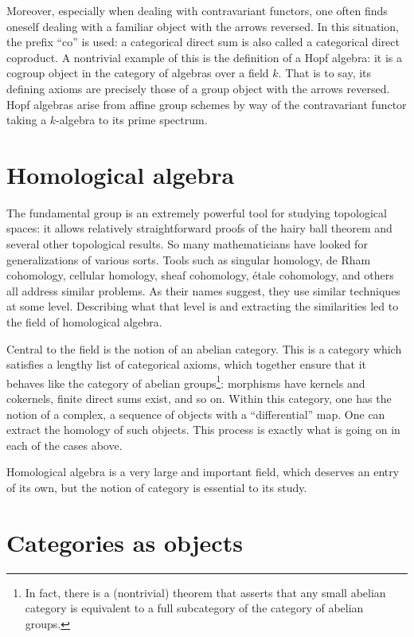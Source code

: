 \documentclass[12pt]{article}
\begin{document}
Moreover, especially when dealing with contravariant functors, one often finds oneself dealing with a familiar object with the arrows reversed.  In this situation, the prefix ``co'' is used: a categorical direct sum is also called a categorical direct coproduct.  A nontrivial example of this is the definition of a Hopf algebra: it is a cogroup object in the category of algebras over a field $k$. That is to say, its defining axioms are precisely those of a group object with the arrows reversed. Hopf algebras arise from affine group schemes by way of the contravariant functor taking a $k$-algebra to its prime spectrum.

\section*{Homological algebra}

The fundamental group is an extremely powerful tool for studying topological spaces: it allows relatively straightforward proofs of the hairy ball theorem and several other topological results.  So many mathematicians have looked for generalizations of various sorts.  Tools such as singular homology, de Rham cohomology, cellular homology, sheaf cohomology, \'etale cohomology, and others all address similar problems.  As their names suggest, they use similar techniques at some level.  Describing what that level is and extracting the similarities led to the field of homological algebra.

Central to the field is the notion of an abelian category.  This is a category which satisfies a lengthy list of categorical axioms, which together ensure that it behaves like the category of abelian groups\footnote{In fact, there is a (nontrivial) theorem that asserts that any small abelian category is equivalent to a full subcategory of the category of abelian groups.}: morphisms have kernels and cokernels, finite direct sums exist, and so on.  Within this category, one has the notion of a complex, a sequence of objects with a ``differential'' map.  One can extract the homology of such objects.  This process is exactly what is going on in each of the cases above.

Homological algebra is a very large and important field, which deserves an entry of its own, but the notion of category is essential to its study.

\section*{Categories as objects}
\end{document}
